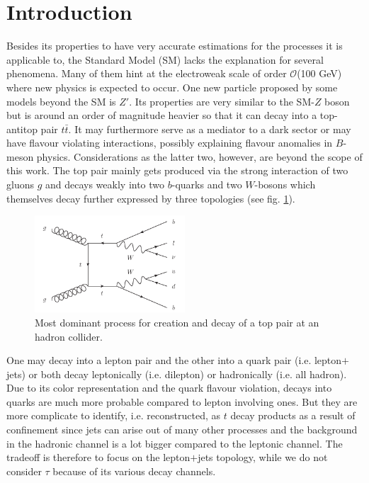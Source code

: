 
\section{Introduction}
Besides its properties to have very accurate estimations for the processes it is applicable to, the Standard Model (SM) lacks the explanation for 
several phenomena. Many of them hint at the electroweak scale of order $\mathcal{O}$(100 GeV) where new physics is expected to occur. One new particle
proposed by some models beyond the SM is $Z'$. Its properties are very similar to the SM-$Z$ boson but is around an order of magnitude heavier so that
it can decay into a top-antitop pair $t\bar t$. It may furthermore serve as a mediator to a dark sector or may have flavour violating interactions, 
possibly 
explaining flavour anomalies in $B$-meson physics. Considerations as the latter two, however, are beyond the scope of this work. The top pair mainly
gets produced via the strong interaction of two gluons $g$ and decays weakly into two $b$-quarks and two $W$-bosons which themselves decay further 
expressed by three topologies (see fig. \ref{pic:feynman}). 
\begin{figure}
 \includegraphics[width=0.5\textwidth]{../pics/e4.pdf}
 \caption{Most dominant process for creation and decay of a top pair at an hadron collider.}
 \label{pic:feynman}
\end{figure}
One may decay into a lepton pair and the other into a quark pair (i.e. lepton$+$jets) or both decay leptonically 
(i.e. dilepton) or hadronically (i.e. all hadron). Due to its color representation and the quark flavour violation, decays into quarks are much more 
probable compared to lepton involving ones. But they are more complicate to identify, i.e. reconstructed, as $t$ decay products as a result of 
confinement since jets can arise out of many other processes and the background in the hadronic channel is a lot bigger compared to the leptonic
channel. The tradeoff is therefore to focus on the lepton$+$jets topology, while we do not consider $\tau$ because of its various decay channels.
